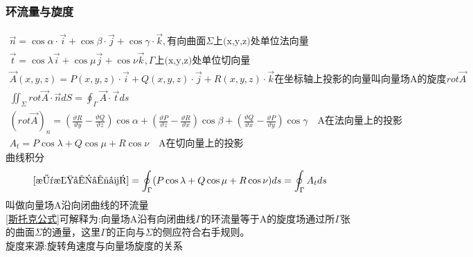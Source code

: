 \documentclass[10pt, a4paper, oneside]{ctexart}
\begin{document}
\begin{sloppypar}
	\subsubsection{环流量与旋度}
	\begin{gather*}
		\overrightarrow{n}=\cos\alpha\cdot\overrightarrow{i} + \cos\beta\cdot\overrightarrow{j} + \cos\gamma \cdot\overrightarrow{k},\text{有向曲面}\Sigma\text{上(x,y,z)处单位法向量}\\
		\overrightarrow{t}=\cos\lambda\overrightarrow{i}+\cos\mu\overrightarrow{j} + \cos\nu \overrightarrow{k}, \Gamma\text{上(x,y,z)处单位切向量}\\
		\overrightarrow{A}(x,y,z)= P(x,y,z)\cdot \overrightarrow{i}+Q(x,y,z)\cdot \overrightarrow{j}+R(x,y,z)\cdot \overrightarrow{k}\text{在坐标轴上投影的向量叫向量场A的旋度}rot\overrightarrow{A}\\
		\iint_\Sigma rot \overrightarrow{A}\cdot \overrightarrow{n}dS = \oint_\Gamma \overrightarrow{A}\cdot \overrightarrow{t}ds\\
		(rot \overrightarrow{A})_n = (\frac{\vartheta R}{\vartheta y} - \frac{\vartheta Q}{\vartheta z})\cos\alpha +(\frac{\vartheta P}{\vartheta z} - \frac{\vartheta R}{\vartheta x})\cos\beta + (\frac{\vartheta Q}{\vartheta x} - \frac{\vartheta P}{\vartheta y})\cos\gamma \quad\text{A在法向量上的投影}\\
		A_t = P\cos\lambda + Q\cos \mu + R\cos\nu\quad\text{A在切向量上的投影}
	\end{gather*}
	曲线积分$$\eqref{斯托克公式}=\oint_\Gamma (P\cos\lambda + Q\cos \mu + R\cos\nu)ds=\oint_\Gamma A_tds$$
	叫做向量场A沿向闭曲线的环流量\\
	\eqref{斯托克公式}可解释为:向量场A沿有向闭曲线$\Gamma$的环流量等于A的旋度场通过所$\Gamma$张的曲面$\Sigma$的通量，这里$\Gamma$的正向与$\Sigma$的侧应符合右手规则。\\
	旋度来源:旋转角速度与向量场旋度的关系


\end{sloppypar}
\end{document}
